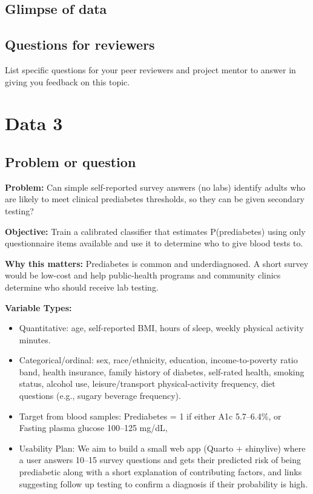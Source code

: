\documentclass[
  letterpaper,
  DIV=11,
  numbers=noendperiod]{scrartcl}
\begin{document}
\subsection{Glimpse of data}\label{glimpse-of-data-1}

\subsection{Questions for reviewers}\label{questions-for-reviewers-1}

List specific questions for your peer reviewers and project mentor to
answer in giving you feedback on this topic.

\section{Data 3}\label{data-3}

\subsection{Problem or question}\label{problem-or-question-2}

\textbf{Problem:} Can simple self-reported survey answers (no labs)
identify adults who are likely to meet clinical prediabetes thresholds,
so they can be given secondary testing?

\textbf{Objective:} Train a calibrated classifier that estimates
P(prediabetes) using only questionnaire items available and use it to
determine who to give blood tests to.

\textbf{Why this matters:} Prediabetes is common and underdiagnosed. A
short survey would be low-cost and help public-health programs and
community clinics determine who should receive lab testing.

\textbf{Variable Types:}

\begin{itemize}
\item
  Quantitative: age, self-reported BMI, hours of sleep, weekly physical
  activity minutes.
\item
  Categorical/ordinal: sex, race/ethnicity, education, income-to-poverty
  ratio band, health insurance, family history of diabetes, self-rated
  health, smoking status, alcohol use, leisure/transport
  physical-activity frequency, diet questions (e.g., sugary beverage
  frequency).
\item
  Target from blood samples: Prediabetes = 1 if either A1c 5.7--6.4\%,
  or Fasting plasma glucose 100--125 mg/dL,
\item
  Usability Plan: We aim to build a small web app (Quarto + shinylive)
  where a user answers 10--15 survey questions and gets their predicted
  risk of being prediabetic along with a short explanation of
  contributing factors, and links suggesting follow up testing to
  confirm a diagnosis if their probability is high.
\end{itemize}
\end{document}
